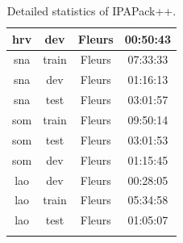 \begin{longtable}{cccc}
hrv & dev & Fleurs & 00:50:43 \\ \midrule
sna & train & Fleurs & 07:33:33 \\ 
sna & dev & Fleurs & 01:16:13 \\ 
sna & test & Fleurs & 03:01:57 \\ \midrule
som & train & Fleurs & 09:50:14 \\ 
som & test & Fleurs & 03:01:53 \\ 
som & dev & Fleurs & 01:15:45 \\ \midrule
lao & dev & Fleurs & 00:28:05 \\ 
lao & train & Fleurs & 05:34:58 \\ 
lao & test & Fleurs & 01:05:07 \\ \bottomrule
\caption{Detailed statistics of IPAPack++.}
\label{app:plus_stats}
\end{longtable}
